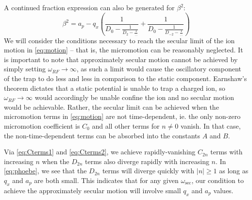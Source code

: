 \documentclass{article}
\begin{document}
A continued fraction expression can also be generated for $\beta^2$:
\begin{equation}
\beta^2 = a_p - q_x \left( \frac{1}{D_0 - \frac{1}{D_2 - \frac{1}{...}}} + \frac{1}{D_0 - \frac{1}{D_{-2} - \frac{1}{...}}} \right) \label{eq:beta}
\end{equation}
We will consider the conditions necessary to reach the secular limit of the ion motion in \eqref{eq:motion} -- that is, the micromotion can be reasonably neglected. It is important to note that approximately secular motion cannot be achieved by simply setting $\omega_{RF} \rightarrow \infty$, as such a limit would cause the oscillatory component of the trap to do less and less in comparison to the static component. Earnshaw's theorem dictates that a static potential is unable to trap a charged ion, so $\omega_{RF} \rightarrow \infty$ would accordingly be unable confine the ion and no secular motion would be achievable. Rather, the secular limit can be achieved when the micromotion terms in \eqref{eq:motion} are not time-dependent, ie. the only non-zero micromotion coefficient is $C_0$ and all other terms for $n \neq 0$ vanish. In that case, the non-time-dependent terms can be absorbed into the constants $A$ and $B$. \par
\medskip
\noindent Via \eqref{eq:Cterms1} and \eqref{eq:Cterms2}, we achieve rapidly-vanishing $C_{2n}$ terms with increasing $n$ when the $D_{2n}$ terms also diverge rapidly with increasing $n$. In \eqref{eq:phoebe}, we see that the $D_{2n}$ terms will diverge quickly with $|n| \ge 1$ as long as $q_x$ and $a_p$ are both small. This indicates that for any given $\omega_{\text{sec}}$, our condition to achieve the approximately secular motion will involve small $q_x$ and $a_p$ values.

\end{document}
